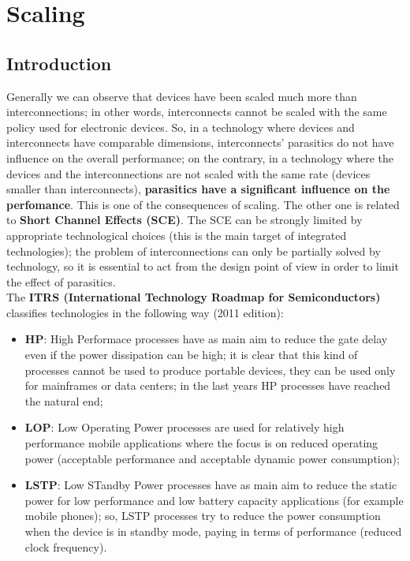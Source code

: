 \documentclass[a4paper, 12pt, twoside, openright]{report}
\begin{document}
\tableofcontents

\chapter{Scaling}

\section{Introduction}

Generally we can observe that devices have been scaled much more than interconnections; in other words, interconnects cannot be scaled with the same policy used for electronic devices. So, in a technology where devices and interconnects have comparable dimensions, interconnects' parasitics do not have influence on the overall performance; on the contrary, in a technology where the devices and the interconnections are not scaled with the same rate (devices smaller than interconnects), \textbf{parasitics have a significant influence on the perfomance}. This is one of the consequences of scaling. The other one is related to \textbf{Short Channel Effects (SCE)}. The SCE can be strongly limited by appropriate technological choices (this is the main target of integrated technologies); the problem of interconnections can only be partially solved by technology, so it is essential to act from the design point of view in order to limit the effect of parasitics.\\

The \textbf{ITRS (International Technology Roadmap for Semiconductors)} classifies technologies in the following way (2011 edition):

	\begin{itemize}
	\item \textbf{HP}: High Performace processes have as main aim to reduce the gate delay even if the power dissipation can be high; it is clear that this kind of processes cannot be used to produce portable devices, they can be used only for mainframes or data centers; in the last years HP processes have reached the natural end;
	\item \textbf{LOP}: Low Operating Power processes are used for relatively high performance mobile applications where the focus is on reduced operating power (acceptable performance and acceptable dynamic power consumption);
	\item \textbf{LSTP}: Low STandby Power processes have as main aim to reduce the static power for low performance and low battery capacity applications (for example mobile phones); so, LSTP processes try to reduce the power consumption when the device is in standby mode, paying in terms of performance (reduced clock frequency).
	\end{itemize}
\end{document}
